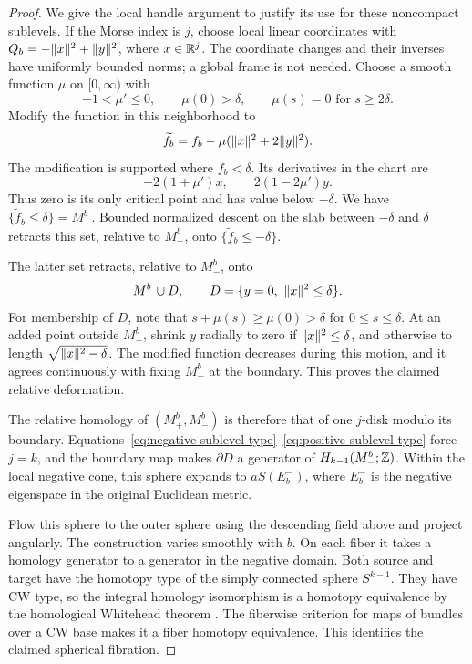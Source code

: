 \begin{proof}
We give the local handle argument to justify its use for these noncompact sublevels. If the Morse index is $j$, choose local linear coordinates with \mbox{$Q_b=-\lVert x\rVert^2+\lVert y\rVert^2$}, where $x\in\mathbb R^j$. The coordinate changes and their inverses have uniformly bounded norms; a global frame is not needed. Choose a smooth function $\mu$ on $[0,\infty)$ with
\[
 -1<\mu'\leq0,\qquad \mu(0)>\delta,
 \qquad \mu(s)=0\text{ for }s\geq2\delta.
\]
Modify the function in this neighborhood to
\[
 \widetilde f_b=f_b-\mu(\lVert x\rVert^2+2\lVert y\rVert^2).
\]
The modification is supported where $f_b<\delta$. Its derivatives in the chart are
\[
 -2(1+\mu')x,\qquad 2(1-2\mu')y.
\]
Thus zero is its only critical point and has value below $-\delta$. We have $\{\widetilde f_b\leq\delta\}=M_+^b$. Bounded normalized descent on the slab between $-\delta$ and $\delta$ retracts this set, relative to $M_-^b$, onto $\{\widetilde f_b\leq-\delta\}$.

The latter set retracts, relative to $M_-^b$, onto
\[
 M_-^b\cup D,\qquad D=\{y=0,\ \norm{x}^2\leq\delta\}.
\]
For membership of $D$, note that $s+\mu(s)\geq\mu(0)>\delta$ for $0\leq s\leq\delta$. At an added point outside $M_-^b$, shrink $y$ radially to zero if $\lVert x\rVert^2\leq\delta$, and otherwise to length $\sqrt{\lVert x\rVert^2-\delta}$. The modified function decreases during this motion, and it agrees continuously with fixing $M_-^b$ at the boundary. This proves the claimed relative deformation.

The relative homology of $(M_+^b,M_-^b)$ is therefore that of one $j$-disk modulo its boundary. Equations~\eqref{eq:negative-sublevel-type}--\eqref{eq:positive-sublevel-type} force $j=k$, and the boundary map makes $\partial D$ a generator of $H_{k-1}(M_-^b;\mathbb Z)$. Within the local negative cone, this sphere expands to $aS(E_b^-)$, where $E_b^-$ is the negative eigenspace in the original Euclidean metric.

Flow this sphere to the outer sphere using the descending field above and project angularly. The construction varies smoothly with $b$. On each fiber it takes a homology generator to a generator in the negative domain. Both source and target have the homotopy type of the simply connected sphere $S^{k-1}$. They have CW type, so the integral homology isomorphism is a homotopy equivalence by the homological Whitehead theorem \cite[Corollary~4.33]{Hatcher2002}. The fiberwise criterion for maps of bundles over a CW base makes it a fiber homotopy equivalence. This identifies the claimed spherical fibration.
\end{proof}

